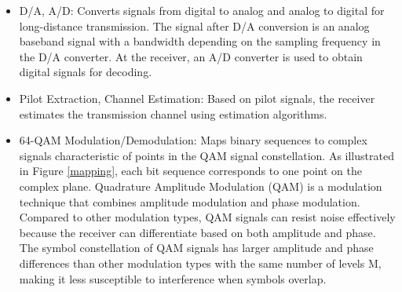 \begin{itemize}
    \item D/A, A/D: Converts signals from digital to analog and analog to digital for long-distance transmission. The signal after D/A conversion is an analog baseband signal with a bandwidth depending on the sampling frequency in the D/A converter. At the receiver, an A/D converter is used to obtain digital signals for decoding.
    \item Pilot Extraction, Channel Estimation: Based on pilot signals, the receiver estimates the transmission channel using estimation algorithms.
    \item 64-QAM Modulation/Demodulation: Maps binary sequences to complex signals characteristic of points in the QAM signal constellation. As illustrated in Figure \ref{mapping}, each bit sequence corresponds to one point on the complex plane. Quadrature Amplitude Modulation (QAM) is a modulation technique that combines amplitude modulation and phase modulation. Compared to other modulation types, QAM signals can resist noise effectively because the receiver can differentiate based on both amplitude and phase. The symbol constellation of QAM signals has larger amplitude and phase differences than other modulation types with the same number of levels M, making it less susceptible to interference when symbols overlap.
\end{itemize}

